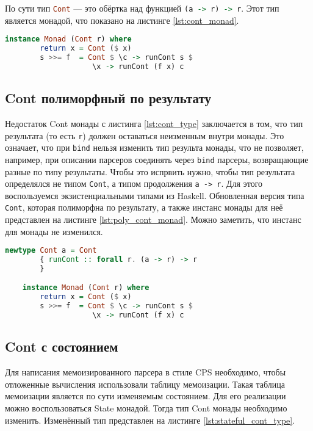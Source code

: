 \documentclass[times]{itmo-student-thesis}
\begin{document}
По сути тип \lstinline[language=Haskell]{Cont} --- это обёртка над функцией \lstinline[language=Haskell]{(a -> r) -> r}.
Этот тип является монадой, что показано на листинге \ref{lst:cont_monad}.

\begin{lstlisting}[language=Haskell,float=!h,caption={Инстанс Monad для Cont},label={lst:cont_monad}]
    instance Monad (Cont r) where
        return x = Cont ($ x)
        s >>= f  = Cont $ \c -> runCont s $ 
                    \x -> runCont (f x) c
\end{lstlisting}

\subsection{Cont полиморфный по результату}\label{sec:poly_cont_monad}

Недостаток Cont монады с листинга \ref{lst:cont_type} заключается в том, что тип результата (то есть
\lstinline{r}) должен оставаться  неизменным внутри монады. Это означает, что при \lstinline{bind} нельзя изменить
тип результа монады, что не позволяет, например, при описании парсеров соединять через \lstinline{bind} парсеры,
возвращающие разные по типу результаты. Чтобы это испрвить нужно, чтобы тип результата определялся не типом
\lstinline{Cont}, а типом продолжения \lstinline{a -> r}. Для этого воспользуемся экзистенциальными типами из Haskell.
Обновленная версия типа \lstinline{Cont}, которая полиморфна по результату, а также инстанс монады для неё
представлен  на листинге \ref{lst:poly_cont_monad}. Можно заметить, что инстанс для монады не изменился.

\begin{lstlisting}[language=Haskell,float=!h,caption={Монада Cont полиморфная по результату},label={lst:poly_cont_monad}]
    newtype Cont a = Cont
        { runCont :: forall r. (a -> r) -> r
        }

    instance Monad (Cont r) where
        return x = Cont ($ x)
        s >>= f  = Cont $ \c -> runCont s $ 
                    \x -> runCont (f x) c
\end{lstlisting}

\subsection{Cont с состоянием}\label{sec:stateful_cont}

Для написания мемоизированного парсера в стиле CPS необходимо, чтобы отложенные вычисления использовали таблицу мемоизации. 
Такая таблица мемоизации является по сути изменяемым состоянием. Для его реализации можно воспользоваться State монадой.
Тогда тип Cont монады необходимо изменить. Изменённый тип представлен на листинге \ref{lst:stateful_cont_type}.
\end{document}
